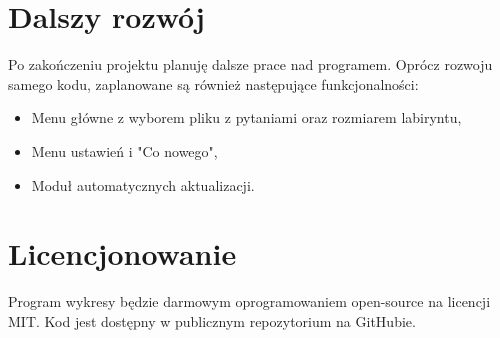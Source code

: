 \documentclass[a4paper]{article}
\begin{document}
\section{Dalszy rozwój}

Po zakończeniu projektu planuję dalsze prace nad programem. Oprócz rozwoju samego kodu, zaplanowane są również następujące funkcjonalności:

\begin{itemize}
    \item Menu główne z wyborem pliku z pytaniami oraz rozmiarem labiryntu,
    \item Menu ustawień i "Co nowego",
    \item Moduł automatycznych aktualizacji.
\end{itemize}

\section{Licencjonowanie}

Program wykresy będzie darmowym oprogramowaniem open-source na licencji MIT. Kod jest dostępny w publicznym repozytorium na GitHubie.
\end{document}

